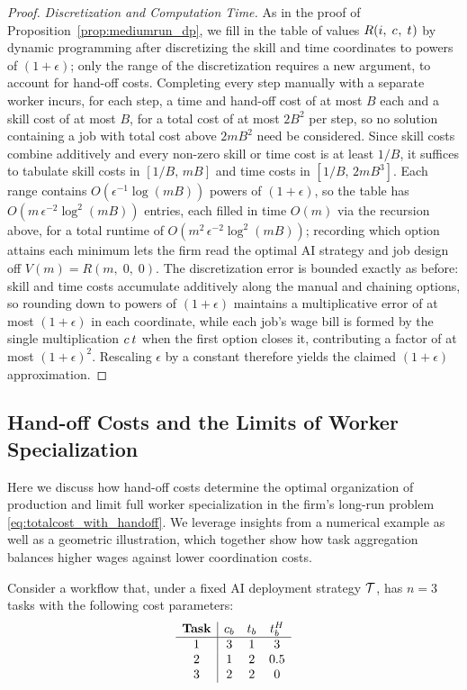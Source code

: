 \begin{proof}
\emph{Discretization and Computation Time.}
As in the proof of Proposition~\ref{prop:mediumrun_dp}, we fill in the table of values $R(i,\; c_{},\; t_{})$ by dynamic programming after discretizing the skill and time coordinates to powers of $(1+\epsilon)$; only the range of the discretization requires a new argument, to account for hand-off costs.
Completing every step manually with a separate worker incurs, for each step, a time and hand-off cost of at most $B$ each and a skill cost of at most $B$, for a total cost of at most $2B^2$ per step, so no solution containing a job with total cost above $2mB^2$ need be considered.
Since skill costs combine additively and every non-zero skill or time cost is at least $1/B$, it suffices to tabulate skill costs in $[1/B,\, mB]$ and time costs in $[1/B,\, 2mB^3]$.
Each range contains $O(\epsilon^{-1}\log(mB))$ powers of $(1+\epsilon)$, so the table has $O(m\,\epsilon^{-2}\log^2(mB))$ entries, each filled in time $O(m)$ via the recursion above, for a total runtime of $O(m^2\,\epsilon^{-2}\log^2(mB))$; recording which option attains each minimum lets the firm read the optimal AI strategy and job design off $V(m) = R(m,\; 0,\; 0)$.
The discretization error is bounded exactly as before: skill and time costs accumulate additively along the manual and chaining options, so rounding down to powers of $(1+\epsilon)$ maintains a multiplicative error of at most $(1+\epsilon)$ in each coordinate, while each job's wage bill is formed by the single multiplication $c_{}\,t_{}$ when the first option closes it, contributing a factor of at most $(1+\epsilon)^2$.
Rescaling $\epsilon$ by a constant therefore yields the claimed $(1+\epsilon)$ approximation.
\end{proof}

\subsection{Hand-off Costs and the Limits of Worker Specialization}
\label{sec:model_discussion}

Here we discuss how hand-off costs determine the optimal organization of production and limit full worker specialization in the firm's long-run problem \eqref{eq:totalcost_with_handoff}.
We leverage insights from a numerical example as well as a geometric illustration, which together show how task aggregation balances higher wages against lower coordination costs.

Consider a workflow that, under a fixed AI deployment strategy $\mathcal{T}$, has $n=3$ tasks with the following cost parameters:
\[
\begin{array}{c|ccc}
\textbf{Task} & c_{b} & t_{b} & t^{H}_{b} \\ \hline
1 & 3  & 1   & 3 \\
2 & 1  & 2   & 0.5 \\
3 & 2  & 2   & 0 \\
\end{array}
\]

